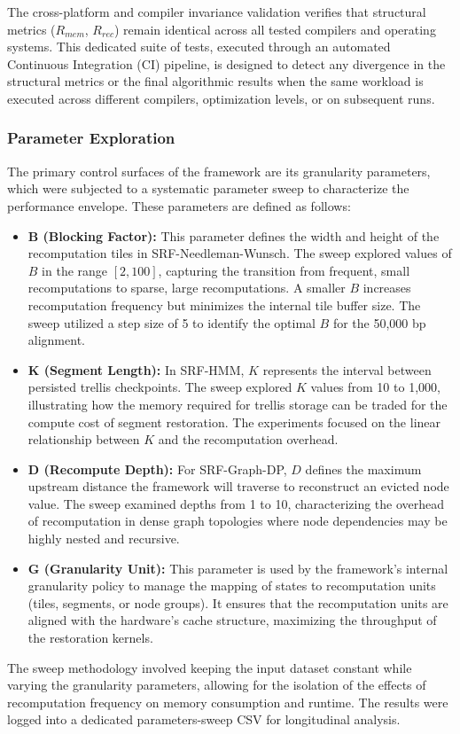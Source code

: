 The cross-platform and compiler invariance validation verifies that structural metrics ($R_{mem}$, $R_{rec}$) remain identical across all tested compilers and operating systems. This dedicated suite of tests, executed through an automated Continuous Integration (CI) pipeline, is designed to detect any divergence in the structural metrics or the final algorithmic results when the same workload is executed across different compilers, optimization levels, or on subsequent runs.

\subsubsection{Parameter Exploration}

The primary control surfaces of the framework are its granularity parameters, which were subjected to a systematic parameter sweep to characterize the performance envelope. These parameters are defined as follows:
\begin{itemize}
    \item \textbf{B (Blocking Factor):} This parameter defines the width and height of the recomputation tiles in SRF-Needleman-Wunsch. The sweep explored values of $B$ in the range $[2, 100]$, capturing the transition from frequent, small recomputations to sparse, large recomputations. A smaller $B$ increases recomputation frequency but minimizes the internal tile buffer size. The sweep utilized a step size of 5 to identify the optimal $B$ for the 50,000 bp alignment.
    \item \textbf{K (Segment Length):} In SRF-HMM, $K$ represents the interval between persisted trellis checkpoints. The sweep explored $K$ values from 10 to 1,000, illustrating how the memory required for trellis storage can be traded for the compute cost of segment restoration. The experiments focused on the linear relationship between $K$ and the recomputation overhead.
    \item \textbf{D (Recompute Depth):} For SRF-Graph-DP, $D$ defines the maximum upstream distance the framework will traverse to reconstruct an evicted node value. The sweep examined depths from 1 to 10, characterizing the overhead of recomputation in dense graph topologies where node dependencies may be highly nested and recursive.
    \item \textbf{G (Granularity Unit):} This parameter is used by the framework's internal granularity policy to manage the mapping of states to recomputation units (tiles, segments, or node groups). It ensures that the recomputation units are aligned with the hardware's cache structure, maximizing the throughput of the restoration kernels.
\end{itemize}
The sweep methodology involved keeping the input dataset constant while varying the granularity parameters, allowing for the isolation of the effects of recomputation frequency on memory consumption and runtime. The results were logged into a dedicated parameters-sweep CSV for longitudinal analysis.

